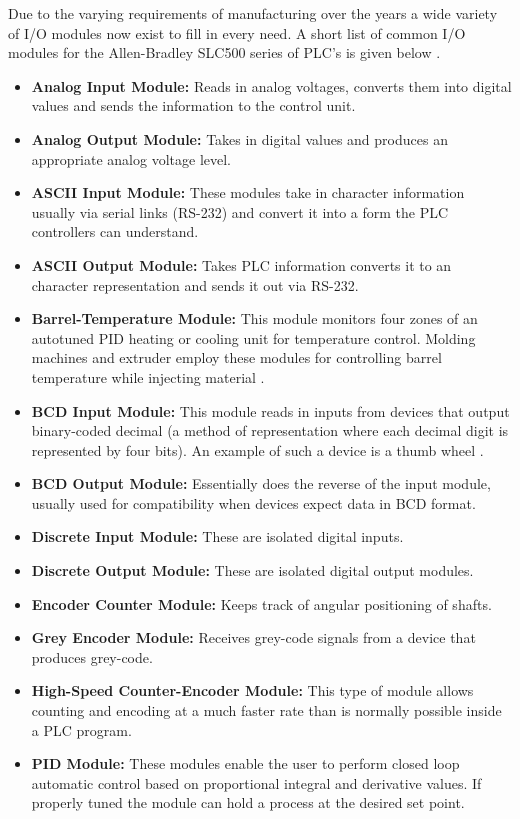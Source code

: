 Due to the varying requirements of manufacturing over the years a wide variety of I/O modules now exist to fill in every need. A short list of common I/O modules for the Allen-Bradley SLC500 series of PLC's is given below \cite{slc500}.
\begin{itemize}
	\item \textbf{Analog Input Module:} Reads in analog voltages, converts them into digital values and sends the information to the control unit.
	\item \textbf{Analog Output Module:} Takes in digital values and produces an appropriate analog voltage level.
	\item \textbf{ASCII Input Module:} These modules take in character information usually via serial links (RS-232) and convert it into a form the PLC controllers can understand\cite{slc500}.
	\item \textbf{ASCII Output Module:} Takes PLC information converts it to an character representation and sends it out via RS-232.
	\item \textbf{Barrel-Temperature Module:} This module monitors four zones of an autotuned PID heating or cooling unit for temperature control. Molding machines and extruder employ these modules for controlling barrel temperature while injecting material \cite{slc500}.
	\item \textbf{BCD Input Module:} This module reads in inputs from devices that output binary-coded decimal (a method of representation where each decimal digit is represented by four bits). An example of such a device is a thumb wheel \cite{slc500}.
	\item \textbf{BCD Output Module:} Essentially does the reverse of the input module, usually used for compatibility when devices expect data in BCD format.
	\item \textbf{Discrete Input Module:} These are isolated digital inputs.
	\item \textbf{Discrete Output Module:} These are isolated digital output modules.
	\item \textbf{Encoder Counter Module:} Keeps track of angular positioning of shafts.
	\item \textbf{Grey Encoder Module:} Receives grey-code signals from a device that produces grey-code.
	\item \textbf{High-Speed Counter-Encoder Module:} This type of module allows counting and encoding at a much faster rate than is normally possible inside a PLC program.
	\item \textbf{PID Module:} These modules enable the user to perform closed loop automatic control based on proportional integral and derivative values. If properly tuned the module can hold a process at the desired set point.

\end{itemize}
